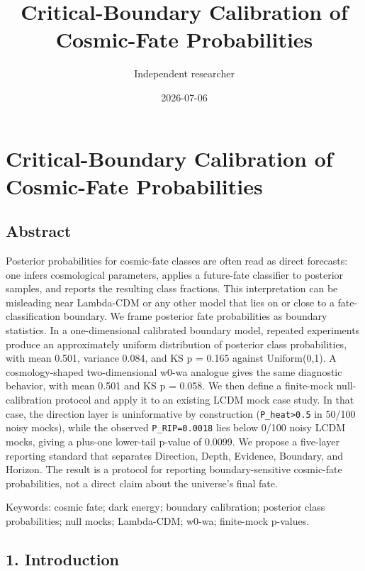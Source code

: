 \documentclass[
]{article}
\title{Critical-Boundary Calibration of Cosmic-Fate Probabilities}
\author{Independent researcher}
\date{2026-07-06}
\begin{document}
\maketitle

\section{Critical-Boundary Calibration of Cosmic-Fate
Probabilities}\label{critical-boundary-calibration-of-cosmic-fate-probabilities}

\subsection{Abstract}\label{abstract}

Posterior probabilities for cosmic-fate classes are often read as direct
forecasts: one infers cosmological parameters, applies a future-fate
classifier to posterior samples, and reports the resulting class
fractions. This interpretation can be misleading near Lambda-CDM or any
other model that lies on or close to a fate-classification boundary. We
frame posterior fate probabilities as boundary statistics. In a
one-dimensional calibrated boundary model, repeated experiments produce
an approximately uniform distribution of posterior class probabilities,
with mean 0.501, variance 0.084, and KS p = 0.165 against Uniform(0,1).
A cosmology-shaped two-dimensional w0-wa analogue gives the same
diagnostic behavior, with mean 0.501 and KS p = 0.058. We then define a
finite-mock null-calibration protocol and apply it to an existing LCDM
mock case study. In that case, the direction layer is uninformative by
construction (\texttt{P\_heat\textgreater{}0.5} in 50/100 noisy mocks),
while the observed \texttt{P\_RIP=0.0018} lies below 0/100 noisy LCDM
mocks, giving a plus-one lower-tail p-value of 0.0099. We propose a
five-layer reporting standard that separates Direction, Depth, Evidence,
Boundary, and Horizon. The result is a protocol for reporting
boundary-sensitive cosmic-fate probabilities, not a direct claim about
the universe's final fate.

Keywords: cosmic fate; dark energy; boundary calibration; posterior
class probabilities; null mocks; Lambda-CDM; w0-wa; finite-mock
p-values.

\subsection{1. Introduction}\label{introduction}
\end{document}
